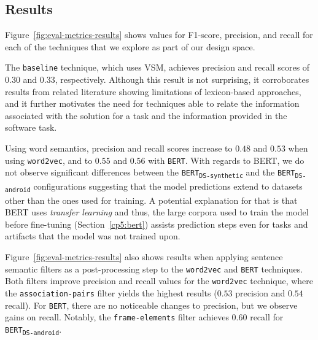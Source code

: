 \subsection{Results}




Figure~\ref{fig:eval-metrics-results} shows values for F1-score, precision, and recall for each of the techniques that we explore as part of our design space. 



The \texttt{baseline} technique, which uses VSM, achieves precision and recall scores of $0.30$ and $0.33$, respectively. 
Although this result is not surprising, it corroborates results from related literature showing limitations of lexicon-based approaches, and 
it further motivates the need for techniques able to relate the information associated with the solution for a task and the information provided in the software task.


Using word semantics, precision and recall scores increase to $0.48$ and $0.53$ when using \texttt{word2vec}, and to $0.55$ and $0.56$ with \texttt{BERT}.
With regards to BERT, we do not observe significant differences between the \texttt{BERT\textsubscript{DS-synthetic}}
and the \texttt{BERT\textsubscript{DS-android}} configurations suggesting that the model predictions extend to datasets other than the ones used for training.
A potential explanation for that is that 
BERT uses \textit{transfer learning}  and thus, the  
large corpora used to train the model before fine-tuning (Section~\ref{cp5:bert}) assists prediction steps even for tasks and artifacts that the model was not trained upon.









Figure~\ref{fig:eval-metrics-results} also shows results when applying sentence semantic filters as
 a post-processing step to the
 \texttt{word2vec} and \texttt{BERT} techniques. 
Both filters improve precision and recall values for the \texttt{word2vec} technique, where the \texttt{association-pairs} filter yields 
the highest results ($0.53$ precision and $0.54$ recall). For \texttt{BERT}, there are no noticeable changes to precision, but 
we observe gains on recall. Notably, the \texttt{frame-elements} filter achieves $0.60$ recall for \texttt{BERT\textsubscript{DS-android}}. 



